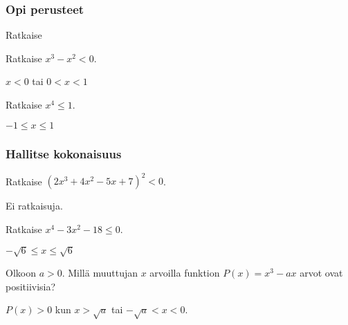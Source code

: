 \begin{tehtavasivu}

\subsubsection*{Opi perusteet}

\begin{tehtava}
    Ratkaise
    \begin{vastaus}
    \end{vastaus}
\end{tehtava}

\begin{tehtava}
    Ratkaise $x^3-x^2<0$.
    \begin{vastaus}
        $x<0$ tai $0<x<1$
    \end{vastaus}
\end{tehtava}

\begin{tehtava}
    Ratkaise $x^4 \le 1$.
    \begin{vastaus}
        $-1 \le x \le 1$
    \end{vastaus}
\end{tehtava}

\subsubsection*{Hallitse kokonaisuus}

\begin{tehtava}
    Ratkaise $(2x^3+4x^2-5x+7)^2 < 0$.
    \begin{vastaus}
        Ei ratkaisuja.
    \end{vastaus}
\end{tehtava}

\begin{tehtava}
    Ratkaise $x^4-3x^2-18 \le 0$.
    \begin{vastaus}
        $-\sqrt{6}\le x \le \sqrt{6}$
    \end{vastaus}
\end{tehtava}

\begin{tehtava} %
Olkoon $a > 0$. Millä muuttujan $x$ arvoilla funktion
$P(x)=x^3-ax$ arvot ovat positiivisia?
    \begin{vastaus}
	$P(x)>0$ kun $x > \sqrt{a}$ tai $-\sqrt{a}<x<0$.
    \end{vastaus}
\end{tehtava}


\end{tehtavasivu}
